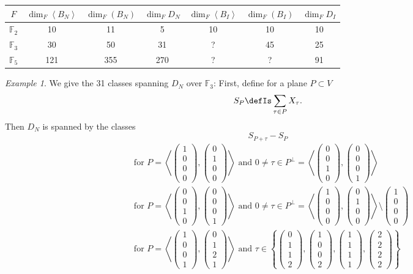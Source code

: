 \documentclass{amsart}
\newcommand{\vect}[1]{\left( \begin{smallmatrix} #1 \end{smallmatrix} \right)}
\newcommand{\plan}[2]{\left< \vect{ #1 }, \vect{ #2 } \right>}
\theoremstyle{plain}
\theoremstyle{definition}
\theoremstyle{remark}
\newtheorem{example}[theorem]{Example}
\begin{document}
\begin{tabular}{c||c|c|c||c|c|c}
 $F$ & $\dim_F \left<B_N\right>$ & $\dim_F(B_N)$ & $\dim_F D_N$ & $\dim_F \left<B_I\right>$ & $\dim_F(B_I)$ & $\dim_F D_I $\\
\hline
$\mathbb F_2$ & 10 & 11 &  5 & 10 & 10 & 10 \\
$\mathbb F_3$ & 30 & 50 & 31 & ? & 45 & 25 \\
$\mathbb F_5$ &121 &355 &270 & ? & ? & 91 
\end{tabular}
\begin{example}
We give the 31 classes spanning $D_N$ over $\mathbb F_3$: 
First, define for a plane $P\subset V$
$$
S_P \defIs  \sum_{\tau \in P} X_\tau.
$$
Then $D_N$ is spanned by the classes 
$$S_{P+\tau} - S_P $$
\begin{align}
&\text{for } P=\plan{1\\0\\0\\0}{0\\1\\0\\0} \text{ and } 0\neq \tau\in P^\perp = \plan{0\\0\\1\\0}{0\\0\\0\\1} 
\\
&\text{for } P=\plan{0\\0\\1\\0}{0\\0\\0\\1}  \text{ and } 0\neq \tau \in P^\perp = \plan{1\\0\\0\\0}{0\\1\\0\\0} \setminus \vect{1\\0\\0\\0}
\\
&\text{for } P=\plan{1\\0\\0\\1}{0\\1\\2\\1} \text{ and } \tau \in \left\{ \vect{0\\1\\1\\2},\vect{1\\0\\0\\2},\vect{1\\1\\1\\1},\vect{2\\2\\2\\2} \right\}

\end{align}
\end{example}
\end{document}
